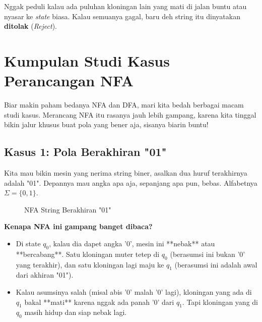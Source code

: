 \documentclass[12pt,a4paper]{article}
\begin{document}
Nggak peduli kalau ada puluhan kloningan lain yang mati di jalan buntu atau nyasar ke \textit{state} biasa. Kalau semuanya gagal, baru deh string itu dinyatakan \textbf{ditolak} (\textit{Reject}).

\newpage
\section{Kumpulan Studi Kasus Perancangan NFA}

Biar makin paham bedanya NFA dan DFA, mari kita bedah berbagai macam studi kasus. Merancang NFA itu rasanya jauh lebih gampang, karena kita tinggal bikin jalur khusus buat pola yang bener aja, sisanya biarin buntu!

\subsection{Kasus 1: Pola Berakhiran "01"}
Kita mau bikin mesin yang nerima string biner, asalkan dua huruf terakhirnya adalah "01". Depannya mau angka apa aja, sepanjang apa pun, bebas. Alfabetnya $\Sigma=\{0,1\}$.

\begin{figure}[h]
    \centering
    \caption{NFA String Berakhiran "01"}
\end{figure}

\textbf{Kenapa NFA ini gampang banget dibaca?}
\begin{itemize}
    \item Di state $q_0$, kalau dia dapet angka '0', mesin ini **nebak** atau **bercabang**. Satu kloningan muter tetep di $q_0$ (berasumsi ini bukan '0' yang terakhir), dan satu kloningan lagi maju ke $q_1$ (berasumsi ini adalah awal dari akhiran "01").
    \item Kalau asumsinya salah (misal abis '0' malah '0' lagi), kloningan yang ada di $q_1$ bakal **mati** karena nggak ada panah '0' dari $q_1$. Tapi kloningan yang di $q_0$ masih hidup dan siap nebak lagi.
\end{itemize}
\end{document}
